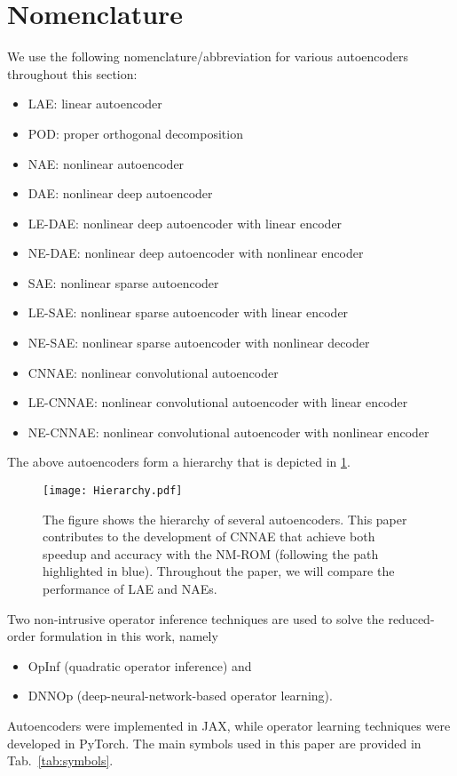 \section{Nomenclature}

We use the following nomenclature/abbreviation for various autoencoders throughout this section:
\begin{itemize}
    \item LAE: linear autoencoder
    \item  POD: proper orthogonal decomposition
    \item NAE: nonlinear autoencoder
    \item DAE: nonlinear deep autoencoder
    \item LE-DAE: nonlinear deep autoencoder with linear encoder
    \item NE-DAE: nonlinear deep autoencoder with nonlinear encoder
    \item SAE: nonlinear sparse autoencoder
    \item LE-SAE: nonlinear sparse autoencoder with linear encoder
    \item NE-SAE: nonlinear sparse autoencoder with nonlinear decoder
    \item CNNAE: nonlinear convolutional autoencoder
    \item LE-CNNAE: nonlinear convolutional autoencoder with linear encoder
    \item NE-CNNAE: nonlinear convolutional autoencoder with nonlinear encoder
    
\end{itemize}
The above autoencoders form a hierarchy that is depicted in \ref{fig: summary of autoencoders}. 
\begin{figure}[!htb]
    \begin{center}
        \texttt{[image: Hierarchy.pdf]}
    \end{center}
    \caption[Hierarchy of several autoencoders.]{The figure shows the hierarchy of several autoencoders. This paper contributes to the development of CNNAE that achieve both speedup and accuracy with the NM-ROM (following the path highlighted in blue). Throughout the paper, we will compare the performance of LAE and NAEs.}
    \label{fig: summary of autoencoders}
\end{figure}
Two non-intrusive operator inference techniques are used to solve the reduced-order formulation in this work, namely
\begin{itemize}
    \item OpInf (quadratic operator inference) and 
    \item DNNOp (deep-neural-network-based operator learning).
\end{itemize}
Autoencoders were implemented in JAX, while operator learning techniques were developed in PyTorch. The main symbols used in this paper are provided in Tab.~\ref{tab:symbols}.

